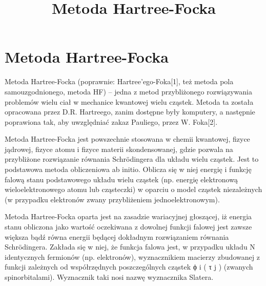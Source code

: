 \documentclass{article}
\begin{document}
\title{Metoda Hartree-Focka}
\maketitle

\section{Metoda Hartree-Focka}
Metoda Hartree-Focka (poprawnie: Hartree'ego-Foka[1], też metoda pola samouzgodnionego, metoda HF) – jedna z metod przybliżonego rozwiązywania problemów wielu ciał w mechanice kwantowej wielu cząstek. Metoda ta została opracowana przez D.R. Hartreego, zanim dostępne były komputery, a następnie poprawiona tak, aby uwzględniać zakaz Pauliego, przez W. Foka[2].

Metoda Hartree-Focka jest powszechnie stosowana w chemii kwantowej, fizyce jądrowej, fizyce atomu i fizyce materii skondensowanej, gdzie pozwala na przybliżone rozwiązanie równania Schrödingera dla układu wielu cząstek. Jest to podstawowa metoda obliczeniowa ab initio. Oblicza się w niej energię i funkcję falową stanu podstawowego układu wielu cząstek (np. energię elektronową wieloelektronowego atomu lub cząsteczki) w oparciu o model cząstek niezależnych (w przypadku elektronów zwany przybliżeniem jednoelektronowym).

Metoda Hartree-Focka oparta jest na zasadzie wariacyjnej głoszącej, iż energia stanu obliczona jako wartość oczekiwana z dowolnej funkcji falowej jest zawsze większa bądź równa energii będącej dokładnym rozwiązaniem równania Schrödingera. Zakłada się w niej, że funkcja falowa jest, w przypadku układu N identycznych fermionów (np. elektronów), wyznacznikiem macierzy zbudowanej z funkcji zależnych od współrzędnych poszczególnych cząstek ϕ i ( τ j ) (zwanych spinorbitalami). Wyznacznik taki nosi nazwę wyznacznika Slatera. 
\end{document}
